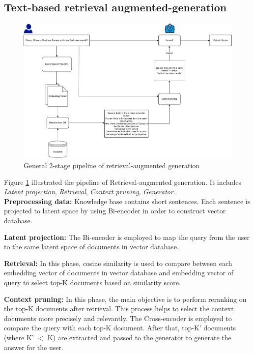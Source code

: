 \subsection{Text-based retrieval augmented-generation}
\begin{figure}[hbt]
    \centering
    \includegraphics[width=0.95\linewidth]{experiements/image/rag.pdf}
    \caption{General 2-stage pipeline of retrieval-augmented generation}
    \label{fig:p_rag}
\end{figure}
Figure \ref{fig:p_rag} illustrated the pipeline of Retrieval-augmented generation. It includes \textit{Latent projection}, \textit{Retrieval}, \textit{Context pruning}, \textit{Generator}.\\
\textbf{Preprocessing data:}  Knowledge base contains short sentences. Each sentence is projected to latent space by using Bi-encoder in order to construct vector database.

\textbf{Latent projection:} The Bi-encoder is employed to map the query from the user to the same latent space of documents in vector database.

\textbf{Retrieval:} In this phase, cosine similarity is used to compare between each embedding vector of documents in vector database and embedding vector of query to select top-K documents based on similarity score.

\textbf{Context pruning:} In this phase, the main objective is to perform reranking on the top-K documents after retrieval. This process helps to select the context documents more precisely and relevantly. The Cross-encoder is employed to compare the query with each top-K document. After that, top-K’ documents (where K’ $<$ K) are extracted and passed to the generator to generate the answer for the user.